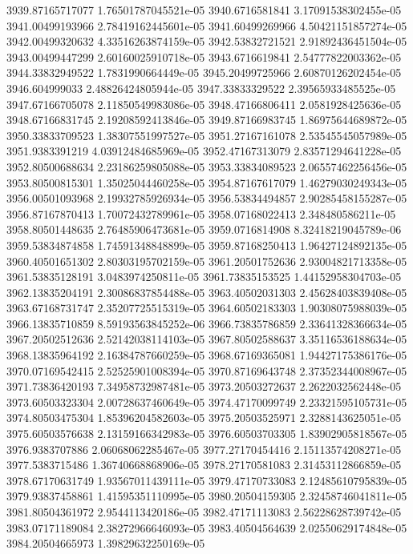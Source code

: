 {3939.87165717077 1.76501787045521e-05
3940.6716581841 3.17091538302455e-05
3941.00499193966 2.78419162445601e-05
3941.60499269966 4.50421151857274e-05
3942.00499320632 4.33516263874159e-05
3942.53832721521 2.91892436451504e-05
3943.00499447299 2.60160025910718e-05
3943.6716619841 2.54777822003362e-05
3944.33832949522 1.7831990664449e-05
3945.20499725966 2.60870126202454e-05
3946.604999033 2.48826424805944e-05
3947.33833329522 2.39565933485525e-05
3947.67166705078 2.11850549983086e-05
3948.47166806411 2.0581928425636e-05
3948.67166831745 2.19208592413846e-05
3949.87166983745 1.86975644689872e-05
3950.33833709523 1.38307551997527e-05
3951.27167161078 2.53545545057989e-05
3951.9383391219 4.03912484685969e-05
3952.47167313079 2.83571294641228e-05
3952.80500688634 2.23186259805088e-05
3953.33834089523 2.06557462256456e-05
3953.80500815301 1.35025044460258e-05
3954.87167617079 1.46279030249343e-05
3956.00501093968 2.19932785926934e-05
3956.53834494857 2.90285458155287e-05
3956.87167870413 1.70072432789961e-05
3958.07168022413 2.348480586211e-05
3958.80501448635 2.76485906473681e-05
3959.0716814908 8.32418219045789e-06
3959.53834874858 1.74591348848899e-05
3959.87168250413 1.96427124892135e-05
3960.40501651302 2.80303195702159e-05
3961.20501752636 2.93004821713358e-05
3961.53835128191 3.0483974250811e-05
3961.73835153525 1.44152958304703e-05
3962.13835204191 2.30086837854488e-05
3963.40502031303 2.45628403839408e-05
3963.67168731747 2.35207725515319e-05
3964.60502183303 1.90308075988039e-05
3966.13835710859 8.59193563845252e-06
3966.73835786859 2.33641328366634e-05
3967.20502512636 2.52142038114103e-05
3967.80502588637 3.35116536188634e-05
3968.13835964192 2.16384787660259e-05
3968.67169365081 1.94427175386176e-05
3970.07169542415 2.52525901008394e-05
3970.87169643748 2.37352344008967e-05
3971.73836420193 7.34958732987481e-05
3973.20503272637 2.2622032562448e-05
3973.60503323304 2.00728637460649e-05
3974.47170099749 2.23321595105731e-05
3974.80503475304 1.85396204582603e-05
3975.20503525971 2.3288143625051e-05
3975.60503576638 2.13159166342983e-05
3976.60503703305 1.83902905818567e-05
3976.9383707886 2.06068062285467e-05
3977.27170454416 2.15113574208271e-05
3977.5383715486 1.36740668868906e-05
3978.27170581083 2.31453112866859e-05
3978.67170631749 1.93567011439111e-05
3979.47170733083 2.12485610795839e-05
3979.93837458861 1.41595351110995e-05
3980.20504159305 2.32458746041811e-05
3981.80504361972 2.9544113420186e-05
3982.47171113083 2.56228628739742e-05
3983.07171189084 2.38272966646093e-05
3983.40504564639 2.02550629174848e-05
3984.20504665973 1.39829632250169e-05
}
